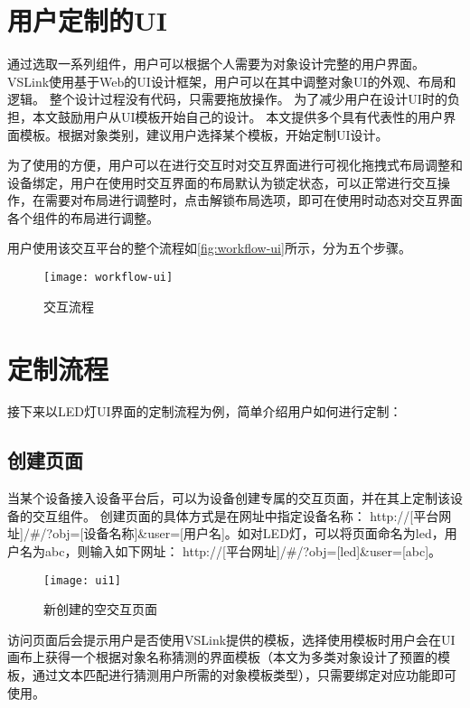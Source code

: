 \section{用户定制的UI}
通过选取一系列组件，用户可以根据个人需要为对象设计完整的用户界面。
VSLink使用基于Web的UI设计框架，用户可以在其中调整对象UI的外观、布局和逻辑。
整个设计过程没有代码，只需要拖放操作。
为了减少用户在设计UI时的负担，本文鼓励用户从UI模板开始自己的设计。
本文提供多个具有代表性的用户界面模板。根据对象类别，建议用户选择某个模板，开始定制UI设计。

为了使用的方便，用户可以在进行交互时对交互界面进行可视化拖拽式布局调整和设备绑定，用户在使用时交互界面的布局默认为锁定状态，可以正常进行交互操作，在需要对布局进行调整时，点击解锁布局选项，即可在使用时动态对交互界面各个组件的布局进行调整。

用户使用该交互平台的整个流程如\autoref{fig:workflow-ui}所示，分为五个步骤。

\begin{figure}[htbp]
	\centering
	\texttt{[image: workflow-ui]}
	\caption{交互流程}
	\label{fig:workflow-ui}
\end{figure}

\section{定制流程}
接下来以LED灯UI界面的定制流程为例，简单介绍用户如何进行定制：
\subsection{创建页面}
当某个设备接入设备平台后，可以为设备创建专属的交互页面，并在其上定制该设备的交互组件。
创建页面的具体方式是在网址中指定设备名称：
http://[平台网址]/\#/?obj=[设备名称]\&user=[用户名]。如对LED灯，可以将页面命名为led，用户名为abc，则输入如下网址：
http://[平台网址]/\#/?obj=[led]\&user=[abc]。

\begin{figure}[htbp]
	\centering
	\texttt{[image: ui1]}
	\caption{新创建的空交互页面}
	\label{fig:ui1}
\end{figure}

访问页面后会提示用户是否使用VSLink提供的模板，选择使用模板时用户会在UI画布上获得一个根据对象名称猜测的界面模板（本文为多类对象设计了预置的模板，通过文本匹配进行猜测用户所需的对象模板类型），只需要绑定对应功能即可使用。

